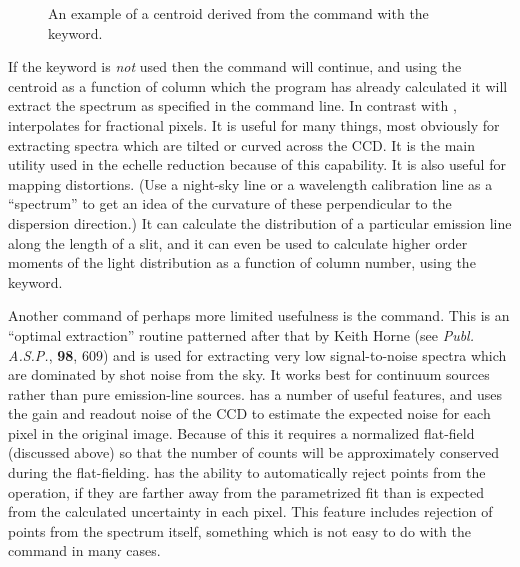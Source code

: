 \begin{figure}[t]
   \centering
   \vspace{4.0in}
   \caption[]{\label{fig:centroid} An example of a centroid derived from the
       command with the  keyword.}
\end{figure}

If the  keyword is {\it not} used then the command will continue,
and using the centroid as a function of column which the program has already
calculated it will extract the spectrum as specified in the command line.  In
contrast with ,  interpolates for fractional
pixels. It is useful for many things, most obviously for extracting spectra
which are tilted or curved across the CCD.  It is the main utility used in the
echelle reduction because of this capability.  It is also useful for mapping
distortions.  (Use a night-sky line or a wavelength calibration line as a
``spectrum'' to get an idea of the curvature of these perpendicular to the
dispersion direction.)  It can calculate the distribution of a particular
emission line along the length of a slit, and it can even be used to calculate
higher order moments of the light distribution as a function of column number,
using the  keyword.

Another command of perhaps more limited usefulness is the 
command.  This is an ``optimal extraction'' routine patterned after that by
Keith Horne (see {\it Publ. A.S.P.}, {\bf 98}, 609) and is used for extracting
very low signal-to-noise spectra which are dominated by shot noise from the
sky.  It works best for continuum sources rather than pure emission-line
sources.   has a number of useful features, and uses the gain
and readout noise of the CCD to estimate the expected noise for each pixel in
the original image.  Because of this it requires a normalized flat-field
(discussed above) so that the number of counts will be approximately conserved
during the flat-fielding.   has the ability to automatically
reject points from the operation, if they are farther away from the
parametrized fit than is expected from the calculated uncertainty in each
pixel.  This feature includes rejection of points from the spectrum itself,
something which is not easy to do with the  command in many cases.

